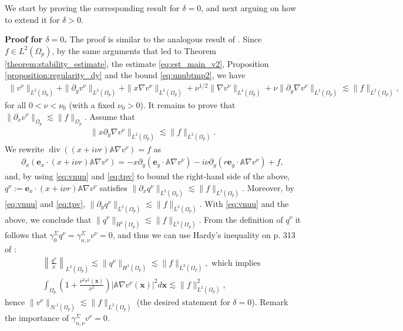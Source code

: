 \documentclass[report]{elsarticle}
\numberwithin{theorem}{section}
\renewcommand{\vec}[1]{\mathbf{#1}}
\begin{document}
We start by proving the corresponding result for $\delta=0$, and next arguing on how to extend it for $\delta>0$. 

\textbf{Proof for $\delta=0$. }The proof is similar to the analogous result of \cite{baouendi_goulaouic}. Since $f\in L^2(\Omega_p)$, by the same arguments that led to Theorem \ref{theorem:stability_estimate}, the estimate \eqref{eq:est_main_v2}, Proposition \ref{proposition:regularity_dy} and the bound \eqref{eq:unubtmp2}, we have 
\begin{align}
	\label{eq:vnuu}
	\|v^{\nu}\|_{L^2(\Omega_p)}+\|\partial_y v^{\nu}\|_{L^2(\Omega_p)}+\|x\nabla v^{\nu}\|_{L^2(\Omega_p)}+\nu^{1/2}\|\nabla v^{\nu}\|_{L^2(\Omega_p)}+\nu\|\partial_y \nabla v^{\nu}\|_{L^2(\Omega_p)}\lesssim \|f\|_{L^2(\Omega_p)},
\end{align}
for all $0<\nu<\nu_0$ (with a fixed $\nu_0>0$). It remains to prove that $\|\partial_x v^{\nu}\|_{\Omega_p}\lesssim \|f\|_{\Omega_p}$. Assume that
\begin{align}
	\label{eq:tpv}
	\|x\partial_y\nabla v^{\nu}\|_{L^2(\Omega_p)}\lesssim \|f\|_{L^2(\Omega_p)}.
\end{align}
We rewrite $\operatorname{div}((x+i\nu r)\mathbb{A}\nabla v^{\nu})=f$ as 
\begin{align*}
\partial_x(\vec{e}_x\cdot (x+i\nu r)\mathbb{A}\nabla v^{\nu})=-x\partial_y(\vec{e}_y\cdot\mathbb{A}\nabla v^{\nu})-i\nu \partial_y(r\vec{e}_y\cdot \mathbb{A}\nabla v^{\nu})+f, 
\end{align*}
and, by using \eqref{eq:vnuu} and \eqref{eq:tpv} to bound the right-hand side of the above, $q^{\nu}:=\vec{e}_x\cdot (x+i\nu r)\mathbb{A}\nabla v^{\nu}$ 
satisfies $
	\|\partial_x q^{\nu}\|_{L^2(\Omega_p)}\lesssim \|f\|_{L^2(\Omega_p)}.$ 
Moreover, by \eqref{eq:vnuu} and \eqref{eq:tpv}, $\|\partial_y q^{\nu}\|_{L^2(\Omega_p)}\lesssim \|f\|_{L^2(\Omega_p)}$. With \eqref{eq:vnuu} and the above, we conclude that 
$
	\|q^{\nu}\|_{H^1(\Omega_p)}\lesssim \|f\|_{L^2(\Omega_p)}.$
From the definition of $q^{\nu}$ it follows that  $\gamma_0^{\Sigma}q^{\nu}=\gamma_{n,\nu}^{\Sigma}v^{\nu}=0$, and thus we can use Hardy's inequality on p. 313 of   \cite{brezis2010functional}: 
\begin{align*}
	\left\|\frac{q^{\nu}}{x}\right\|_{L^2(\Omega_p)}\lesssim \|q^{\nu}\|_{H^1(\Omega_p)}\lesssim \|f\|_{L^2(\Omega_p)}, \text{ which implies }\\
\int_{\Omega_p}\left(1+\frac{\nu^2 r^2(\vec{x})}{x^2}\right)|\mathbb{A}\nabla v^{\nu}(\vec{x})|^2d\vec{x} \lesssim \|f\|^2_{L^2(\Omega_p)},
\end{align*}
hence $\|v^{\nu}\|_{\mathcal{H}^1(\Omega_p)}\lesssim \|f\|_{L^2(\Omega_p)}$ (the desired statement for $\delta=0$). Remark the importance of  $\gamma_{n,\nu}^{\Sigma}v^{\nu}=0$.
\end{document}

